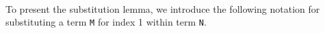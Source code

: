 \begin{fence}
\begin{code}
\>[5][@{}l@{\AgdaIndent{0}}]%
\>[7]\AgdaSpace{}%
\AgdaSymbol{(}\AgdaSpace{}%
\AgdaSymbol{)}\AgdaSpace{}%
\AgdaSymbol{(}\AgdaSpace{}%
\AgdaOperator{\AgdaFunction{[}}\AgdaSpace{}%
\AgdaSpace{}%
\AgdaOperator{\AgdaFunction{]}}\AgdaSymbol{)}\<%
\\
%
\>[5]\AgdaSpace{}%
\AgdaSpace{}%
\AgdaSymbol{(}\AgdaSymbol{)}\AgdaSpace{}%
\<%
\\
\>[5][@{}l@{\AgdaIndent{0}}]%
\>[7]\AgdaSpace{}%
\AgdaSpace{}%
\AgdaSymbol{(}\AgdaSpace{}%
\AgdaOperator{\AgdaFunction{[}}\AgdaSpace{}%
\AgdaSpace{}%
\AgdaOperator{\AgdaFunction{]}}\AgdaSymbol{)}\<%
\\
%
\>[5]\<%
\end{code}
\end{fence}

To present the substitution lemma, we introduce the following notation
for substituting a term \texttt{M} for index 1 within term \texttt{N}.


